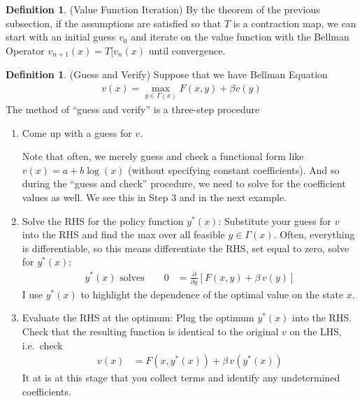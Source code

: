 \documentclass[12pt]{article}
\numberwithin{equation}{section} %
\theoremstyle{plain}
\theoremstyle{definition}
\newtheorem{defn}[thm]{Definition}
\theoremstyle{remark}
\begin{document}
\begin{defn}(Value Function Iteration)
By the theorem of the previous subsection, if the assumptions are
satisfied so that $T$ is a contraction map, we can start with an initial
guess $v_0$ and iterate on the value function with the Bellman Operator
 $v_{n+1}(x)=T[v_n(x)$ until convergence.
\end{defn}

\begin{defn}(Guess and Verify)
Suppose that we have Bellman Equation
\begin{align*}
  v(x) = \max_{y\in\Gamma(x)} F(x,y) + \beta v(y)
\end{align*}
The method of ``guess and verify'' is a three-step procedure
\begin{enumerate}
  \item Come up with a guess for $v$.

    Note that often, we merely guess and check a functional form like
    $v(x)=a + b\log(x)$ (without specifying constant coefficients). And
    so during the ``guess and check'' procedure, we need to solve for
    the coefficient values as well. We see this in Step 3 and in the
    next example.

  \item Solve the RHS for the policy function $y^*(x)$: Substitute your
    guess for $v$ into the RHS and find the max over all feasible
    $y\in\Gamma(x)$.  Often, everything is differentiable, so this means
    differentiate the RHS, set equal to zero, solve for $y^*(x)$:
    \begin{align*}
      \text{$y^*(x)$ solves} \qquad
      0 &= \frac{\partial}{\partial y}
      \left[
        F(x,y) + \beta\, v(y)
      \right]
    \end{align*}
    I use $y^*(x)$ to highlight the dependence of the optimal value on
    the state $x$.

  \item Evaluate the RHS at the optimum: Plug the optimum $y^*(x)$ into
    the RHS. Check that the resulting function is identical to the
    original $v$ on the LHS, i.e.\ check
    \begin{align*}
      v(x) &= F(x,y^*(x)) + \beta\, v(y^*(x))
    \end{align*}
    It at is at this stage that you collect terms and identify any
    undetermined coefficients.
\end{enumerate}
\end{defn}
\end{document}
